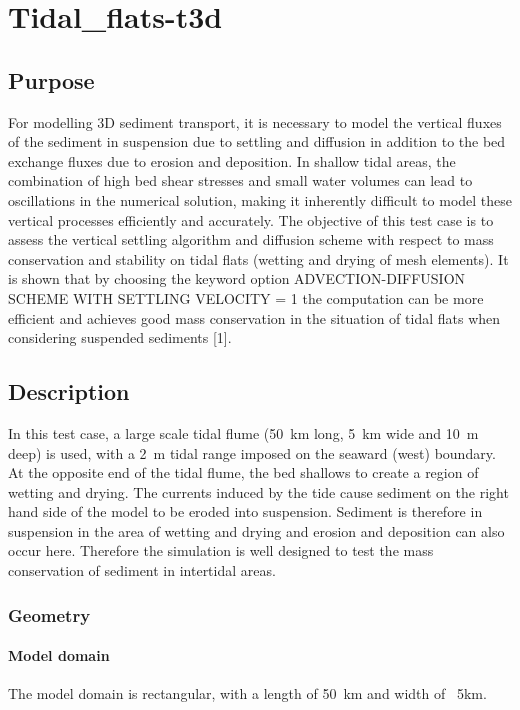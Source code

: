 \chapter{Tidal\_flats-t3d}
%
%
\section{Purpose}
%
For modelling 3D sediment transport, it is necessary to model the vertical 
fluxes of the sediment in suspension due to settling and diffusion in addition to
the bed exchange fluxes due to erosion and deposition. In shallow
tidal areas, the combination of high bed shear stresses and small water volumes 
can lead to oscillations in the numerical solution, making it inherently difficult 
to model these vertical processes efficiently and accurately.
%
The objective of this test case is to assess the vertical 
settling algorithm and diffusion scheme with respect to mass 
conservation and stability on tidal flats (wetting and drying of mesh elements). 
It is shown that by choosing the keyword option ADVECTION-DIFFUSION SCHEME WITH SETTLING VELOCITY = 1 
the computation can be more efficient and achieves good mass conservation 
in the situation of tidal flats when considering suspended sediments [1]. 
%
\section{Description}
%
In this test case, a large scale tidal flume (50~km long, 5~km wide and 10~m deep) is 
used, with a 2~m tidal range imposed on the seaward (west) boundary. At the opposite end
of the tidal flume, the bed shallows to create a region of wetting and drying.
The currents induced by the tide cause sediment on the right hand side of the model to be eroded into
suspension. Sediment is therefore in suspension in the area of wetting and drying and erosion 
and deposition can also occur here. Therefore the simulation is well designed to test the 
mass conservation of sediment in intertidal areas.
%
%
%
\subsection{Geometry}
%
%
\subsubsection{Model domain}
%
The model domain is rectangular, with a length of 50~km and width of ~5km.
%
